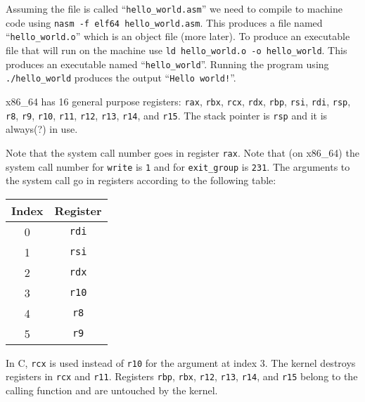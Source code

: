 Assuming the file is called ``\texttt{hello_world.asm}'' we need to
compile to machine code using \texttt{nasm -f elf64
  hello_world.asm}. This produces a file named
``\texttt{hello_world.o}'' which is an object file (more later). To
produce an executable file that will run on the machine use
\texttt{ld hello_world.o -o hello_world}. This produces an
executable named ``\texttt{hello_world}''. Running the program
using \texttt{./hello_world} produces the output
``\texttt{Hello world!}''.

x86\_64 has 16 general purpose registers: \texttt{rax},
\texttt{rbx}, \texttt{rcx}, \texttt{rdx},
\texttt{rbp}, \texttt{rsi}, \texttt{rdi},
\texttt{rsp}, \texttt{r8}, \texttt{r9},
\texttt{r10}, \texttt{r11}, \texttt{r12},
\texttt{r13}, \texttt{r14}, and \texttt{r15}. The
stack pointer is \texttt{rsp} and it is always(?) in use.

Note that the system call number goes in register \texttt{rax}. Note
that (on x86\_64) the system call number for \texttt{write} is
\texttt{1} and for \texttt{exit_group} is \texttt{231}. The arguments
to the system call go in registers according to the following table:

{\ttfamily\begin{tabular}{c c}
  \hline
  Index & Register \\
  \hline
  0 & \texttt{rdi} \\
  1 & \texttt{rsi} \\
  2 & \texttt{rdx} \\
  3 & \texttt{r10} \\
  4 & \texttt{r8} \\
  5 & \texttt{r9} \\
\end{tabular}}

In C, \texttt{rcx} is used instead of \texttt{r10} for the
argument at index 3. The kernel destroys registers in \texttt{rcx} and
\texttt{r11}. Registers \texttt{rbp}, \texttt{rbx},
\texttt{r12}, \texttt{r13}, \texttt{r14}, and
\texttt{r15} belong to the calling function and are untouched by the
kernel.
